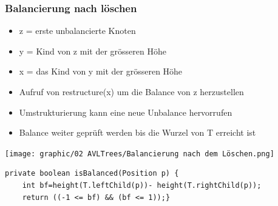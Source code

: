 \subsubsection{Balancierung nach löschen}
\begin{itemize}
    \item z = erste unbalancierte Knoten
    \item y = Kind von z mit der grösseren Höhe
    \item x = das Kind von y mit der grösseren Höhe
    \item Aufruf von restructure(x) um die Balance von z herzustellen
    \item Umstrukturierung kann eine neue Unbalance hervorrufen
    \item Balance weiter geprüft werden bis die Wurzel von T erreicht ist
\end{itemize}
\begin{center}
    \texttt{[image: graphic/02 AVLTrees/Balancierung nach dem Löschen.png]}
\end{center}
\begin{lstlisting}
private boolean isBalanced(Position p) {
    int bf=height(T.leftChild(p))- height(T.rightChild(p));
    return ((-1 <= bf) && (bf <= 1));}
\end{lstlisting}

